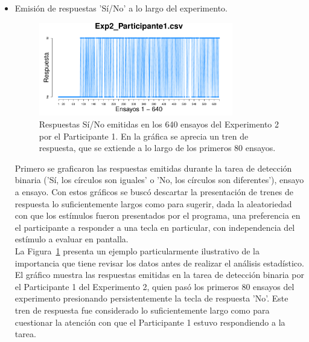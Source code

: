 \begin{itemize}
	\item Emisión de respuestas 'Sí/No' a lo largo del experimento.

\begin{figure}[h]
\centering
\includegraphics[width=0.8\textwidth]{Figures/Response_Exp2_P1} 
\decoRule
\caption[Explorando datos individuales (ejemplo): Respuesta emitida por cada ensayo a la tarea binaria]{Respuestas Sí/No emitidas en los 640 ensayos del Experimento 2 por el Participante 1. En la gráfica se aprecia un tren de respuesta, que se extiende a lo largo de los primeros 80 ensayos.}
\label{fig:Resp_E2_P1}
\end{figure}

Primero se graficaron las respuestas emitidas durante la tarea de detección binaria ('Sí, los círculos son iguales' o 'No, los círculos son diferentes'), ensayo a ensayo. Con estos gráficos se buscó descartar la presentación de trenes de respuesta lo suficientemente largos como para sugerir, dada la aleatoriedad con que los estímulos fueron presentados por el programa, una preferencia en el participante a responder a una tecla en particular, con independencia del estímulo a evaluar en pantalla.\\

La Figura~\ref{fig:Resp_E2_P1} presenta un ejemplo particularmente ilustrativo de la importancia que tiene revisar los datos antes de realizar el análisis estadístico. El gráfico muestra las respuestas emitidas en la tarea de detección binaria por el Participante 1 del Experimento 2, quien pasó los primeros 80 ensayos del experimento presionando persistentemente la tecla de respuesta 'No'. Este tren de respuesta fue considerado lo suficientemente largo como para cuestionar la atención con que el Participante 1 estuvo respondiendo a la tarea.\\ 



\end{itemize}
